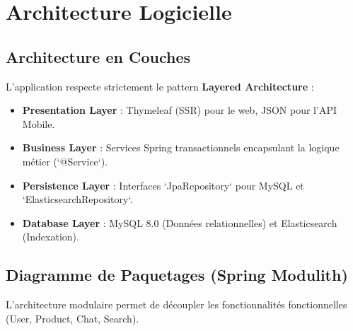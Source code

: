 \documentclass[12pt,a4paper]{article}
\begin{document}
\newpage

\section{Architecture Logicielle}

\subsection{Architecture en Couches}
L'application respecte strictement le pattern \textbf{Layered Architecture} :
\begin{itemize}
    \item \textbf{Presentation Layer} : Thymeleaf (SSR) pour le web, JSON pour l'API Mobile.
    \item \textbf{Business Layer} : Services Spring transactionnels encapsulant la logique métier (`@Service`).
    \item \textbf{Persistence Layer} : Interfaces `JpaRepository` pour MySQL et `ElasticsearchRepository`.
    \item \textbf{Database Layer} : MySQL 8.0 (Données relationnelles) et Elasticsearch (Indexation).
\end{itemize}

\subsection{Diagramme de Paquetages (Spring Modulith)}
L'architecture modulaire permet de découpler les fonctionnalités fonctionnelles (User, Product, Chat, Search).

\begin{center}
\end{center}
\end{document}
